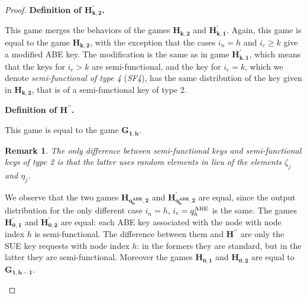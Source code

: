 \documentclass[a4paper,10pt]{article}
\newtheorem{remark}{Remark}
\newcommand{\game}[2]{$\mathbf{#1_{#2}}$}
\newcommand{\gamedef}[3]{
\textbf{Definition of \game{#1}{#2}.}
#3}
\newcommand{\sffour}{SF4}
\begin{document}
\begin{proof}
		\gamedef{H^\prime}{k,2}{
		This game merges the behaviors of the games \game{H}{k,2} and \game{H^\prime}{k,1}. Again, this game is equal to the game \game{H}{k,2}, with the exception that the cases $i_n=h$ and $i_c\geq k$ give a modified ABE key. The modification is the same as in game \game{H^\prime}{k,1}, which means that the keys for $i_c > k$ are semi-functional, and the key for $i_c=k$, which we denote \emph{semi-functional of type 4} (\emph{\sffour}), has the same distribution of the key given in \game{H}{k,2}, that is of a semi-functional key of type 2.
		}
		
		\gamedef{H^{\prime\prime}}{}{
		This game is equal to the game \game{G}{1,h}.
		}
		
		\begin{remark}The only difference between semi-functional keys and semi-functional keys of type 2 is that the latter uses random elements in lieu of the elements $\zeta_j$ and $\eta_j$.
		\end{remark}
		
		We observe that the two games \game{H}{q_h^\textbf{ABE},2} and \game{H^\prime}{q_h^\textbf{ABE},2} are equal, since the output distribution for the only different case $i_n=h$, $i_c=q_h^\textnormal{ABE}$ is the same.
		The games \game{H^\prime}{0,1} and \game{H^\prime}{0,2} are equal: each ABE key associated with the node with node index $h$ is semi-functional. The difference between them and \game{H^{\prime\prime}}{} are only the SUE key requests with node index $h$: in the formers they are standard, but in the latter they are semi-functional.
		Moreover the games \game{H}{0,1} and \game{H}{0,2} are equal to \game{G}{1,h-1}.
		
		\begin{table}[H]
		\begin{center}
		\makebox[\textwidth][c]{ \renewcommand{\arraystretch}{1.2}


}
\end{center}
\end{table}
\end{proof}
\end{document}

